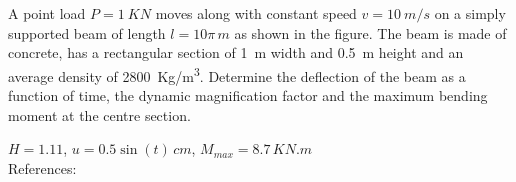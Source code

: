 
\begin{Exercise}[label={moving_load}]
A point load $P=\SI{1}{KN}$ moves along with constant speed $v=\SI{10}{m/s}$ on a simply supported beam of length $l=10\pi\,\si{m}$ as shown in the figure. The beam is made of concrete, has a rectangular section of \qty{1}{m} width and \qty{0.5}{m} height and an average density of \qty{2800}{Kg/m^3}. Determine the deflection of the beam as a function of time, the dynamic magnification factor and the maximum bending moment at the centre section.

\begin{center}
\end{center}

\shortAnswer $H=1.11$, $u=0.5\sin(t)\,\si{cm}$, $M_{max} = 8.7\,\si{KN.m}$ \\
References: \cite[page 305]{chopra}
\end{Exercise}



